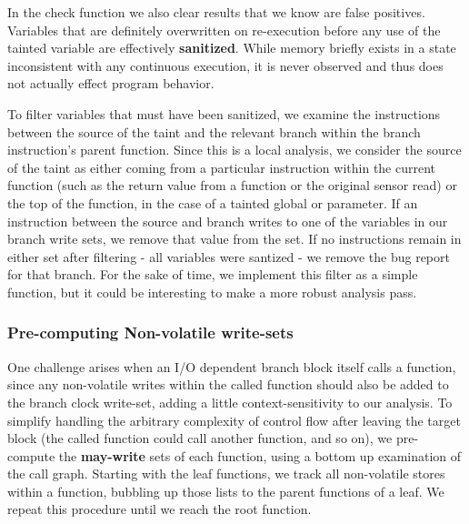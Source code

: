 In the check function we also clear results that we know are false positives. Variables that are definitely overwritten on re-execution before any use of the tainted variable are effectively \textbf{sanitized}. While memory briefly exists in a state inconsistent with any continuous execution, it is never observed and thus does not actually effect program behavior.

To filter variables that must have been sanitized, we examine the instructions between the source of the taint and the relevant branch within the branch instruction's parent function. Since this is a local analysis, we consider the source of the taint as either coming from a particular instruction within the current function (such as the return value from a function or the original sensor read) or the top of the function, in the case of a tainted global or parameter. If an instruction between the source and branch writes to one of the variables in our branch write sets, we remove that value from the set. If no instructions remain in either set after filtering - all variables were santized - we remove the bug report for that branch. For the sake of time, we implement this filter as a simple function, but it could be interesting to make a more robust analysis pass.

\subsubsection{Pre-computing Non-volatile write-sets}

One challenge arises when an I/O dependent branch block itself calls a function, since any non-volatile writes within the called function should also be added to the branch clock write-set, adding a little context-sensitivity to our analysis.  To simplify handling the arbitrary complexity of control flow after leaving the target block (the called function could call another function, and so on), we pre-compute the {\bf may-write} sets of each function, using a bottom up examination of the call graph. Starting with the leaf functions, we track all non-volatile stores within a function, bubbling up those lists to the parent functions of a leaf. We repeat this procedure until we reach the root function. 